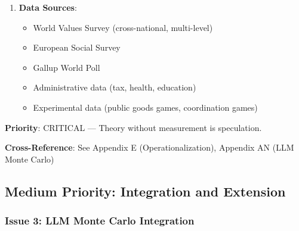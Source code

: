 \begin{tcolorbox}[colback=red!5!white, colframe=red!75!black, title=Status: Incomplete]
\begin{enumerate}
\item \textbf{Data Sources}:
    \begin{itemize}[nosep]
    \item World Values Survey (cross-national, multi-level)
    \item European Social Survey
    \item Gallup World Poll
    \item Administrative data (tax, health, education)
    \item Experimental data (public goods games, coordination games)
    \end{itemize}
\end{enumerate}

\textbf{Priority}: \colorbox{red!20}{CRITICAL} --- Theory without measurement is speculation.

\textbf{Cross-Reference}: See Appendix E (Operationalization), Appendix AN (LLM Monte Carlo)
\end{tcolorbox}

\subsection{Medium Priority: Integration and Extension}

\subsubsection{Issue 3: LLM Monte Carlo Integration}


